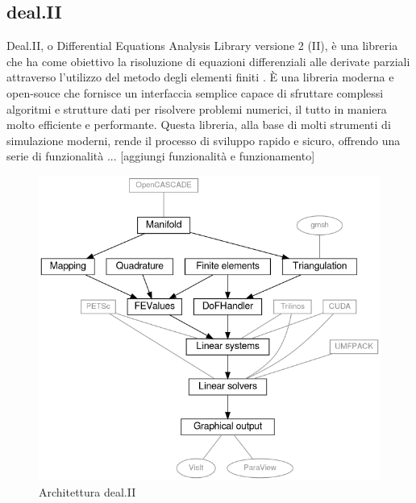     \subsection{deal.II}\label{dealii}
    Deal.II, o Differential Equations Analysis Library versione 2 (II), è una libreria che ha come obiettivo la risoluzione
    di equazioni differenziali alle derivate parziali attraverso l'utilizzo del metodo degli elementi finiti \cite{dealII92}.
    È una libreria moderna e open-souce che fornisce un interfaccia semplice capace di sfruttare complessi algoritmi
    e strutture dati per risolvere problemi numerici, il tutto in maniera molto efficiente e performante.
    Questa libreria, alla base di molti strumenti di simulazione moderni, rende il processo di sviluppo rapido
    e sicuro, offrendo una serie di funzionalità ... [aggiungi funzionalità e funzionamento]
    \begin{figure}[H]
        \centering
        \includegraphics[width=\linewidth]{figure/dealii-detail.png}
        \caption{Architettura deal.II}
    \end{figure}
    \newpage\newpage
